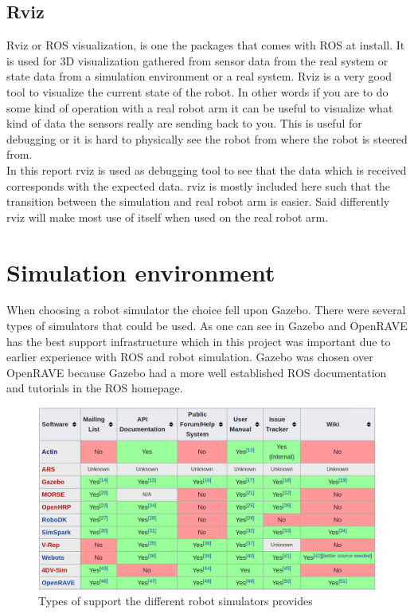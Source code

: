 \subsection{Rviz}
Rviz or ROS visualization, is one the packages that comes with ROS at install. It is used for 3D visualization gathered from sensor data from the real system or state data from a simulation environment or a real system. Rviz is a very good tool to visualize the current state of the robot. In other words if you are to do some kind of operation with a real robot arm it can be useful to visualize what kind of data the sensors really are sending back to you. This is useful for debugging or it is hard to physically see the robot from where the robot is steered from.\\
In this report rviz is used as debugging tool to see that the data which is received corresponds with the expected data. rviz is mostly included here such that the transition between the simulation and real robot arm is easier. Said differently rviz will make most use of itself when used on the real robot arm\cite{ROSWiki}. 

\section{Simulation environment}
When choosing a robot simulator the choice fell upon Gazebo. There were several types of simulators that could be used. As one can see in  Gazebo and OpenRAVE has the best support infrastructure which in this project was important due to earlier experience with ROS and robot simulation\cite{wikiRobSim}. Gazebo was chosen over OpenRAVE because Gazebo had a more well established ROS documentation and tutorials in the ROS homepage. \\




\begin{figure}[htbp]
  \centering
  \includegraphics[width=.9\textwidth]{img/WikipTableRobSim.png}
  \caption{Types of support the different robot simulators provides\cite{wikiRobSim}}
  \label{fig:infra}
\end{figure}

